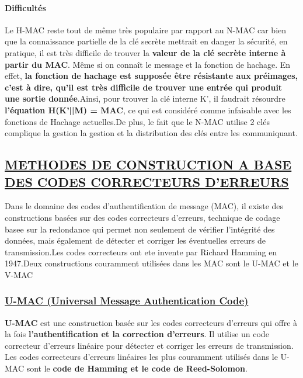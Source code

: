 \paragraph{\textbf{Difficultés}}

Le H-MAC reste tout de même très populaire par rapport au N-MAC car bien que la connaissance partielle de la clé secrète mettrait en danger la sécurité, en pratique, il est très difficile de trouver la \textbf{valeur de la clé secrète interne à partir du MAC}. Même si on connaît le message et la fonction de hachage.
En effet, \textbf{la fonction de hachage est supposée être résistante aux préimages, c’est à dire, qu’il est très difficile de trouver une entrée qui produit une sortie donnée}.Ainsi, pour trouver la clé interne K’, il faudrait résourdre \textbf{l’équation H(K’||M) = MAC}, ce qui est considéré comme infaisable avec les fonctions de Hachage actuelles.De plus, le fait que le N-MAC utilise 2 clés complique la gestion la gestion et la distribution des clés entre les communiquant.

\newpage


\subsection{\textbf{\underline{METHODES DE CONSTRUCTION A BASE DES CODES CORRECTEURS D'ERREURS}}}


Dans le domaine des codes d'authentification de message (MAC), il existe des constructions basées sur des codes correcteurs d'erreurs, technique de codage basee sur la redondance  qui permet non seulement de vérifier l'intégrité des données, mais également de détecter et corriger les éventuelles erreurs de transmission.Les codes correcteurs ont ete invente par Richard Hamming en 1947.Deux constructions couramment utilisées dans les MAC sont le U-MAC et le V-MAC

\subsubsection{\textbf{\underline{ U-MAC (Universal Message Authentication Code)}}}

\textbf{U-MAC} est une construction basée sur les codes correcteurs d'erreurs qui offre à la fois \textbf{l'authentification et la correction d'erreurs}. Il utilise un code correcteur d'erreurs linéaire pour détecter et corriger les erreurs de transmission. Les codes correcteurs d'erreurs linéaires les plus 
couramment utilisés dans le U-MAC sont le \textbf{code de Hamming et le code de Reed-Solomon}.

